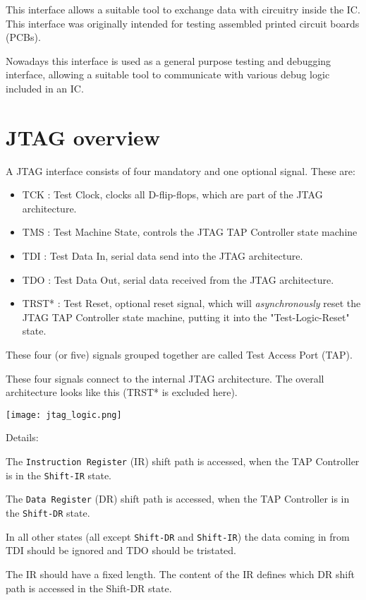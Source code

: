 \documentclass[10pt,english,a4paper]{report}
\begin{document}
This interface allows a suitable tool to exchange data with circuitry inside the IC.
This interface was originally intended for testing assembled printed circuit boards (PCBs).

Nowadays this interface is used as a general purpose testing and debugging interface,
allowing a suitable tool to communicate with various debug logic included in an IC.

\newpage
\section{JTAG overview}
\label{jtagintro}

A JTAG interface consists of four mandatory and one optional signal. These are:
\begin{itemize}
\item TCK : Test Clock, clocks all D-flip-flops, which are part of the JTAG architecture.
\item TMS : Test Machine State, controls the JTAG TAP Controller state machine
\item TDI : Test Data In, serial data send into the JTAG architecture.
\item TDO : Test Data Out, serial data received from the JTAG architecture.
\item TRST* : Test Reset, optional reset signal, which will {\em asynchronously} reset the JTAG TAP Controller state machine,
putting it into the "Test-Logic-Reset" state.
\end{itemize}
These four (or five) signals grouped together are called Test Access Port (TAP).

These four signals connect to the internal JTAG architecture. The overall
architecture looks like this (TRST* is excluded here).
\begin{center}
	\texttt{[image: jtag\_logic.png]}
\end{center}
Details:

The {\tt Instruction Register} (IR) shift path is accessed, when the TAP Controller is in the {\tt Shift-IR} state.

The {\tt Data Register} (DR) shift path is accessed, when the TAP Controller is in the {\tt Shift-DR} state.

In all other states (all except {\tt Shift-DR} and {\tt Shift-IR}) the data coming in from TDI should be ignored and TDO should be tristated.

The IR should have a fixed length. The content of the IR defines which DR shift path is accessed in the Shift-DR state.
\end{document}
